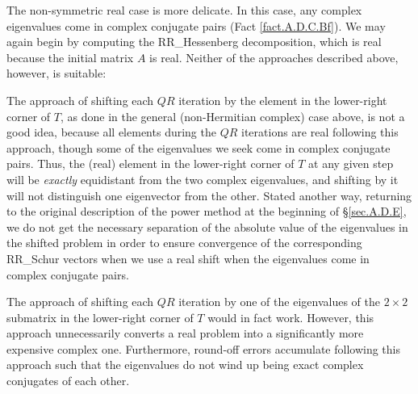 \begin{figure*}[t]
\end{figure*}


\noindent The non-symmetric real case is more delicate.  In this case, any complex eigenvalues come in complex conjugate pairs (Fact \ref{fact.A.D.C.Bf}).
We may again begin by computing the RR_Hessenberg decomposition, which is real because the initial matrix $A$ is real.  Neither of the approaches described above, however, is suitable:
\beginmylistb
\item The approach of shifting each $QR$ iteration by the element in the lower-right corner of $T$, as done in the general (non-Hermitian complex) case above, is
not a good idea, because all elements during the $QR$ iterations are real following this approach, though some of the eigenvalues we seek come in complex conjugate pairs.
Thus, the (real) element in the lower-right corner of $T$ at any given step
will be {\it exactly} equidistant from the two complex eigenvalues, and shifting by it will not distinguish one eigenvector from the other.  Stated another way,
returning to the original description of the power method at the beginning of \S \ref{sec.A.D.E}, we do not get the necessary separation of the absolute value of the eigenvalues in the shifted problem
in order to ensure convergence of the corresponding RR_Schur vectors when we use a real shift when the eigenvalues come in complex conjugate pairs. 
\item The approach of shifting each $QR$ iteration by one of the eigenvalues of the $2\times 2$ submatrix in the
lower-right corner of $T$ would in fact work.  However, this approach unnecessarily converts a real problem into a significantly more expensive complex one.  Furthermore, round-off errors accumulate following this approach
such that the eigenvalues do not wind up being exact complex conjugates of each other.
\endmylist

